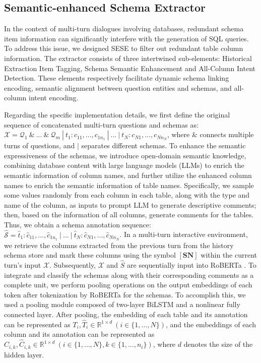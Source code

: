 \documentclass[11pt]{article}
\begin{document}
\subsection{Semantic-enhanced Schema Extractor}
\label{sec:Multi-turn Schema Item Extractor}
In the context of multi-turn dialogues involving databases, redundant schema item information can significantly interfere with the generation of SQL queries. To address this issue, we designed SESE to filter out redundant table column information. 
The extractor consists of three intertwined sub-elements: Historical Extraction Item Tagging, Schema Semantic Enhancement and All-Column Intent Detection. These elements respectively facilitate dynamic schema linking encoding, semantic alignment between question entities and schemas, and all-column intent encoding.

Regarding the specific implementation details, we first define the original sequence of concatenated multi-turn questions and schemas as: $\mathcal{X} = \mathcal{Q}_{1} \ \& \  ... \ \&\ \mathcal{Q}_{m}\ |\  t_{1} : c_{11}, ... , c_{1n_{1} } \ |\  ... \ |\  t_{N} : c_{N1} , ... ,c_{Nn_{N} }$, where $\&$ connects multiple turns of questions, and $|$ separates different schemas. To enhance the semantic expressiveness of the schemas, we introduce open-domain semantic knowledge, combining database content with large language models (LLMs) to enrich the semantic information of column names, and further utilize the enhanced column names to enrich the semantic information of table names. Specifically, we sample some values randomly from each column in each table, along with the type and name of the column, as inputs to prompt LLM to generate descriptive comments; then, based on the information of all columns, generate comments for the tables. Thus, we obtain a schema annotation sequence: $\hat{\mathcal{S}} = \hat{t}_{1} : \hat{c}_{11}, ... , \hat{c}_{1n_{1} } \ |\  ... \ |\ \hat{t}_{N} : \hat{c}_{N1} , ... ,\hat{c}_{Nn_{N} }$. In a multi-turn interactive environment, we retrieve the columns extracted from the previous turn from the history schema store and mark these columns using the symbol $\mathbf{[SN]}$ within the current turn's input $\mathcal{X}$. Subsequently, $\mathcal{X}$ and $\hat{S}$ are sequentially input into RoBERTa \cite{liu2019robertarobustlyoptimizedbert}. To integrate and classify the schemas along with their corresponding comments as a complete unit, we perform pooling operations on the output embeddings of each token after tokenization by RoBERTa for the schemas. To accomplish this, we used a pooling module composed of two-layer BiLSTM \cite{zhou-etal-2016-attention} and a nonlinear fully connected layer. After pooling, the embedding of each table and its annotation can be represented as $T_{i}, \hat{T}_{i} \in \mathbb{R}^{1 \times d} \ (i \in \{1, \ldots, N\})$, and the embeddings of each column and its annotation can be represented as $C_{i,k}, \hat{C}_{i,k} \in \mathbb{R}^{1 \times d} \ (i \in \{1, \ldots, N\}, k \in \{1, \ldots, n_{i}\})$, where $d$ denotes the size of the hidden layer.
\end{document}
